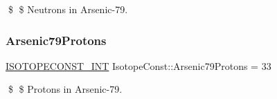 \$ \$ Neutrons in Arsenic-\/79. \mbox{\label{group___isotope_const-_arsenic-_as79_gaca6db41c3dc9278c93374d723fc20867}} 
\subsubsection{\texorpdfstring{Arsenic79\+Protons}{Arsenic79Protons}}
{\footnotesize\ttfamily \mbox{\hyperlink{group___isotope_const-_macros_ga5f18360b3e99483a35c32d789e62621c}{I\+S\+O\+T\+O\+P\+E\+C\+O\+N\+S\+T\+\_\+\+I\+NT}} Isotope\+Const\+::\+Arsenic79\+Protons = 33}

\$ \$ Protons in Arsenic-\/79. 